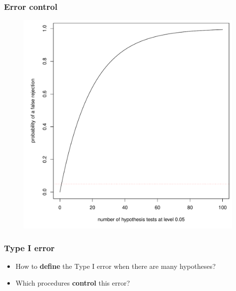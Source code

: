 \documentclass[xcolor={dvipsnames}]{beamer}
\newcommand{\rbf}[1]{\textcolor{redUnipd}{ #1}}
\begin{document}

\begin{frame}
\frametitle{Error control}
\begin{figure}
    \centering
\includegraphics[width = .6\textwidth]{plaatjes/typeI}
\end{figure}
\end{frame}


\begin{frame}
\frametitle{Type I error}
\begin{itemize}
    \item How to \textbf{define} the \rbf{Type I error} when there are many hypotheses?
    \bigskip
    \item Which procedures \textbf{control} this error?
\end{itemize}
\end{frame}
\end{document}
